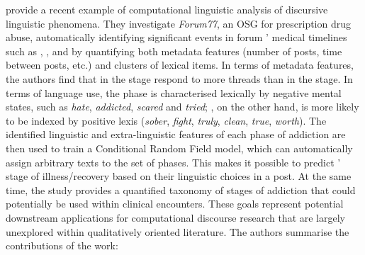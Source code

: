 \textcite{maclean_forum77:_2015} provide a recent example of computational linguistic analysis of discursive linguistic phenomena. They investigate \emph{Forum77}, an \gls{OSG} for prescription drug abuse, automatically identifying significant events in forum ' medical timelines such as , ,  and  by quantifying both metadata features (number of \glspl{post}, time between \glspl{post}, etc.) and clusters of lexical items. In terms of metadata features, the authors find that  in the  stage respond to more \glspl{thread} than  in the  stage. In terms of language use, the  phase is characterised lexically by negative mental states, such as \emph{hate}, \emph{addicted}, \emph{scared} and \emph{tried}; , on the other hand, is more likely to be indexed by positive lexis (\emph{sober}, \emph{fight}, \emph{truly}, \emph{clean}, \emph{true}, \emph{worth}). The identified linguistic and extra\hyp{}linguistic features of each phase of addiction are then used to train a Conditional Random Field model, which can automatically assign arbitrary texts to the set of phases. This makes it possible to predict ' stage of illness\slash recovery based on their linguistic choices in a \gls{post}. At the same time, the study provides a quantified taxonomy of stages of addiction that could potentially be used within clinical encounters. These goals represent potential downstream applications for computational discourse research that are largely unexplored within qualitatively oriented literature. The authors summarise the contributions of the work:

